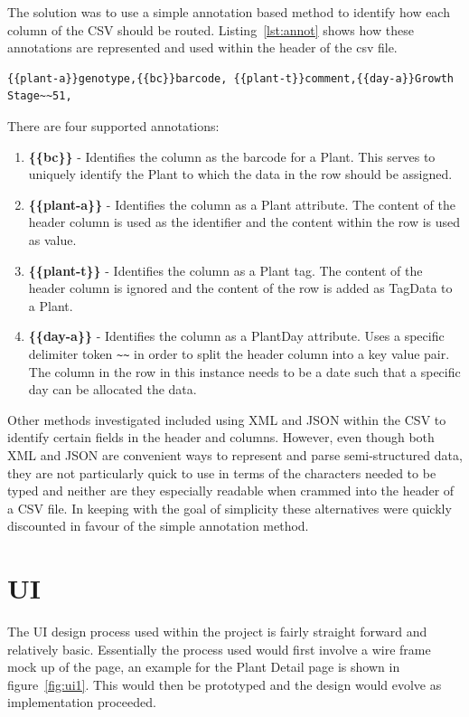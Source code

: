The solution was to use a simple annotation based method to identify how each column of the CSV should be routed. Listing~\ref{lst:annot} shows how these annotations are represented and used within the header of the csv file. 
\begin{lstlisting}[label={lst:annot},caption=Excerpt showing annotated CSV header for data import]
{{plant-a}}genotype,{{bc}}barcode, {{plant-t}}comment,{{day-a}}Growth Stage~~51,
\end{lstlisting}
There are four supported annotations:
\begin{enumerate}
\item \textbf{\{\{bc\}\}} - Identifies the column as the barcode for a Plant. This serves to uniquely identify the Plant to which the data in the row should be assigned.
\item \textbf{\{\{plant-a\}\}} - Identifies the column as a Plant attribute. The content of the header column is used as the identifier and the content within the row is used as value. 
\item \textbf{\{\{plant-t\}\}} - Identifies the column as a Plant tag. The content of the header column is ignored and the content of the row is added as TagData to a Plant.
\item \textbf{\{\{day-a\}\}} - Identifies the column as a PlantDay attribute. Uses a specific delimiter token \verb|~~| in order to split the header column into a key value pair. The column in the row in this instance needs to be a date such that a specific day can be allocated the data.
\end{enumerate}

Other methods investigated included using XML and JSON within the CSV to identify certain fields in the header and columns. However, even though both XML and JSON are convenient ways to represent and parse semi-structured data, they are not particularly quick to use in terms of the characters needed to be typed and neither are they especially readable when crammed into the header of a CSV file. In keeping with the goal of simplicity these alternatives were quickly discounted in favour of the simple annotation method. 

\section{UI}
The UI design process used within the project is fairly straight forward and relatively basic. Essentially the process used would first involve a wire frame mock up of the page, an example for the Plant Detail page is shown in figure~\ref{fig:ui1}. This would then be prototyped and the design would evolve as implementation proceeded. 

